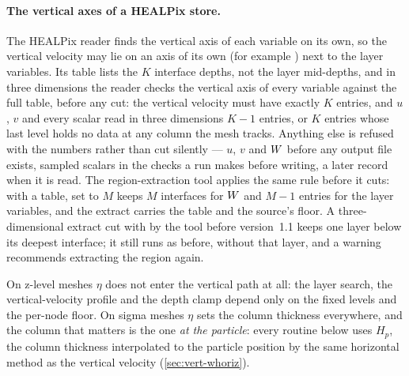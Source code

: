 \paragraph{The vertical axes of a HEALPix store.}\label{sec:vert-healpix-axes} The HEALPix reader finds the
vertical axis of each variable on its own, so the vertical velocity may lie on an axis of its own (for
example ) next to the layer variables. Its table lists the $K$ interface depths, not the layer
mid-depths, and in three dimensions the reader checks the vertical axis of every variable against the full
table, before any  cut: the vertical velocity must have exactly $K$ entries, and $u$, $v$
and every scalar read in three dimensions $K-1$ entries, or $K$ entries whose last level holds no data at
any column the mesh tracks. Anything else is refused with the numbers rather than cut silently --- $u$, $v$
and $W$ before any output file exists, sampled scalars in the checks a run makes before writing, a later
record when it is read. The region-extraction tool applies the same rule before it cuts: with a table,
 set to $M$ keeps $M$ interfaces for $W$ and $M-1$ entries for the layer variables,
and the extract carries the table and the source's floor. A three-dimensional extract cut with
 by the tool before version~1.1 keeps one layer below its deepest interface; it
still runs as before, without that layer, and a warning recommends extracting the region again.


On z-level meshes $\eta$ does not enter the vertical path at all: the layer search, the
vertical-velocity profile and the depth clamp depend only on the fixed levels and the per-node floor.
On sigma meshes $\eta$ sets the column thickness everywhere, and the column that matters is the one
\emph{at the particle}: every routine below uses $H_p$, the column thickness interpolated to the
particle position by the same horizontal method as the vertical velocity (\cref{sec:vert-whoriz}).

